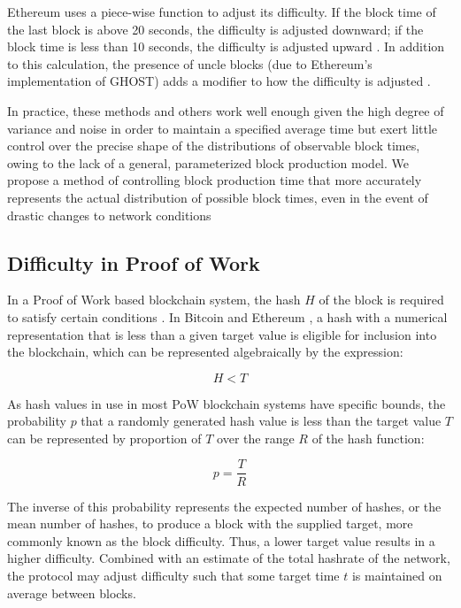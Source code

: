 \documentclass[]{article}
\begin{document}
Ethereum uses a piece-wise function to adjust its difficulty.  If the block time of the last block is above 20 seconds, the difficulty is adjusted downward; if the block time is less than 10 seconds, the difficulty is adjusted upward \cite{EthereumDifficulty}.  In addition to this calculation, the presence of uncle blocks (due to Ethereum's implementation of GHOST) adds a modifier to how the difficulty is adjusted \cite{EthereumUncles}.
\newline

In practice, these methods and others work well enough given the high degree of variance and noise in order to maintain a specified average time but exert little control over the precise shape of the distributions of observable block times, owing to the lack of a general, parameterized block production model.  We propose a method of controlling block production time that more accurately represents the actual distribution of possible block times, even in the event of drastic changes to network conditions

\subsection{Difficulty in Proof of Work}
In a Proof of Work based blockchain system, the hash $H$ of the block is required to satisfy certain conditions \cite{BitcoinWhitepaper}.  In Bitcoin \cite{BitcoinPOW} and Ethereum \cite{EthereumPOW} \cite{EthereumYellowpaper}, a hash with a numerical representation that is less than a given target value is eligible for inclusion into the blockchain, which can be represented algebraically by the expression:

\begin{equation}
H < T
\end{equation}

As hash values in use in most PoW blockchain systems have specific bounds, the probability $p$ that a randomly generated hash value is less than the target value $T$ can be represented by proportion of $T$ over the range $R$ of the hash function: 

\begin{equation}
	p = \frac{T}{R} 
\end{equation}

The inverse of this probability represents the expected number of hashes, or the mean number of hashes, to produce a block with the supplied target, more commonly known as the block difficulty.  Thus, a lower target value results in a higher difficulty.  Combined with an estimate of the total hashrate of the network, the protocol may adjust difficulty such that some target time $t$ is maintained on average between blocks.  
\end{document}
